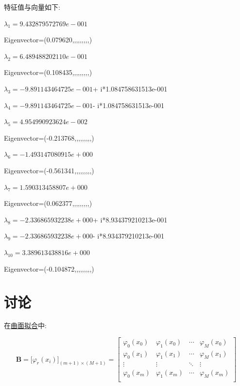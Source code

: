 \newpage
特征值与向量如下:

$\lambda_{1}= 9.432879572769e-001$ 

Eigenvector=(0.079620,,,,,,,,,)


\vbox{}
$\lambda_{2}= 6.489488202110e-001$ 

Eigenvector=(0.108435,,,,,,,,,)


\vbox{}
$\lambda_{3}= -9.891143464725e-001$+ i*1.084758631513e-001


\vbox{}
$\lambda_{4}= -9.891143464725e-001$- i*1.084758631513e-001


\vbox{}
$\lambda_{5}= 4.954990923624e-002$ 

Eigenvector=(-0.213768,,,,,,,,,)


\vbox{}
$\lambda_{6}= -1.493147080915e+000$ 

Eigenvector=(-0.561341,,,,,,,,,)


\vbox{}
$\lambda_{7}= 1.590313458807e+000$ 

Eigenvector=(0.062377,,,,,,,,,)


\vbox{}
$\lambda_{8}= -2.336865932238e+000$+ i*8.934379210213e-001


\vbox{}
$\lambda_{9}= -2.336865932238e+000$- i*8.934379210213e-001


\vbox{}
$\lambda_{10}= 3.389613438816e+000$ 

Eigenvector=(-0.104872,,,,,,,,,)

\chapter{讨论}
\label{sec:discuss}
在\hyperref[sec:qmnh]{曲面拟合}中:

\[\bm{B} =\big[\varphi_{r}(x_i)\big]_{(m+1)\times (M+1)}=
\begin{bmatrix}
{\varphi_{0}(x_0)}&{\varphi_{1}(x_0)}& \cdots &{\varphi_{M}(x_0)}\\
{\varphi_{0}(x_1)}&{\varphi_{1}(x_1)}& \cdots &{\varphi_{M}(x_1)}\\
 \vdots & \vdots & \ddots & \vdots \\
{\varphi_{0}(x_m)}&{\varphi_{1}(x_m)}& \cdots &{\varphi_{M}(x_m)}\\
\end{bmatrix}\]

